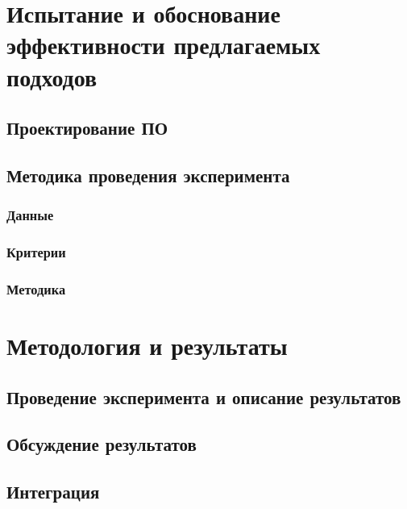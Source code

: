 \chapter{Испытание и обоснование эффективности предлагаемых подходов}
\section{Проектирование ПО}
\section{Методика проведения эксперимента}
\subsection{Данные}
\subsection{Критерии}
\subsection{Методика}

\chapter{Методология и результаты}
\section{Проведение эксперимента и описание результатов}
\section{Обсуждение результатов}
\section{Интеграция}